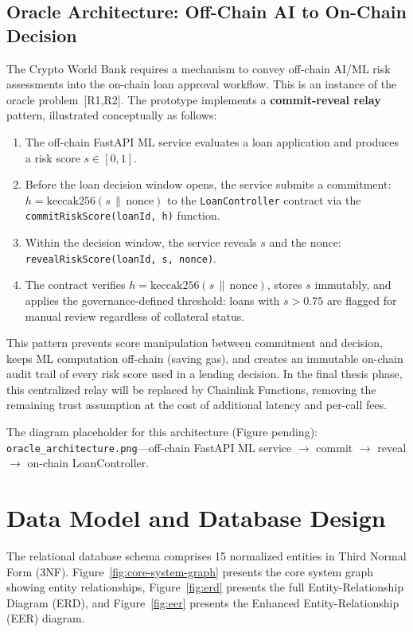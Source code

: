 \documentclass[12pt,a4paper]{report}
\begin{document}
\subsection{Oracle Architecture: Off-Chain AI to On-Chain Decision}
\label{sec:oracle-architecture}

The Crypto World Bank requires a mechanism to convey off-chain AI/ML risk assessments into the on-chain loan approval workflow. This is an instance of the oracle problem~[R1,R2]. The prototype implements a \textbf{commit-reveal relay} pattern, illustrated conceptually as follows:

\begin{enumerate}[noitemsep]
\item The off-chain FastAPI ML service evaluates a loan application and produces a risk score $s \in [0,1]$.
\item Before the loan decision window opens, the service submits a commitment: $h = \text{keccak256}(s \,\|\, \text{nonce})$ to the \texttt{LoanController} contract via the \texttt{commitRiskScore(loanId, h)} function.
\item Within the decision window, the service reveals $s$ and the nonce: \texttt{revealRiskScore(loanId, s, nonce)}.
\item The contract verifies $h = \text{keccak256}(s \,\|\, \text{nonce})$, stores $s$ immutably, and applies the governance-defined threshold: loans with $s > 0.75$ are flagged for manual review regardless of collateral status.
\end{enumerate}

This pattern prevents score manipulation between commitment and decision, keeps ML computation off-chain (saving gas), and creates an immutable on-chain audit trail of every risk score used in a lending decision. In the final thesis phase, this centralized relay will be replaced by Chainlink Functions, removing the remaining trust assumption at the cost of additional latency and per-call fees.

The diagram placeholder for this architecture (Figure pending): \texttt{oracle\_architecture.png}---off-chain FastAPI ML service $\to$ commit $\to$ reveal $\to$ on-chain LoanController.


\section{Data Model and Database Design}

The relational database schema comprises 15 normalized entities in Third Normal Form (3NF). Figure~\ref{fig:core-system-graph} presents the core system graph showing entity relationships, Figure~\ref{fig:erd} presents the full Entity-Relationship Diagram (ERD), and Figure~\ref{fig:eer} presents the Enhanced Entity-Relationship (EER) diagram.
\end{document}
